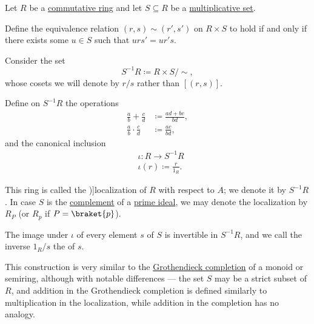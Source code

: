 \begin{definition}\label{def:ring_localization}
  Let \( R \) be a \hyperref[def:ring/commutative]{commutative ring} and let \( S \subseteq R \) be a \hyperref[def:multiplicative_set_in_ring]{multiplicative set}.

  Define the equivalence relation \( (r, s) \sim (r', s') \) on \( R \times S \) to hold if and only if there exists some \( u \in S \) such that \( u r s' = u r' s \).

  Consider the set
  \begin{equation*}
    S^{-1} R \coloneqq R \times S / {\sim},
  \end{equation*}
  whose cosets we will denote by \( r / s \) rather than \( [(r, s)] \).

  Define on \( S^{-1} R \) the operations
  \begin{align*}
    \frac a b + \frac c d     &\coloneqq \frac {a d + b c} {b d}, \\
    \frac a b \cdot \frac c d &\coloneqq \frac {a c} {b d},
  \end{align*}
  and the canonical inclusion
  \begin{equation*}
    \begin{aligned}
      &\iota: R \to S^{-1} R \\
      &\iota(r) \coloneqq \frac r {1_R}.
    \end{aligned}
  \end{equation*}

  This ring is called the \term[bg=локализация (\cite[23]{КоцевСидеров2016})]{localization} of \( R \) with respect to \( A \); we denote it by \( S^{-1} R \). In case \( S \) is the \hyperref[thm:boolean_algebra_of_subsets/complement]{complement} of a \hyperref[def:semiring_ideal/prime]{prime ideal}, we may denote the localization by \( R_P \) (or \( R_p \) if \( P = \braket{ p } \)).

  The image under \( \iota \) of every element \( s \) of \( S \) is invertible in \( S^{-1} R \), and we call the inverse \( 1_R / s \) the  of \( s \).
\end{definition}
\begin{comments}
  \item This construction is very similar to the \hyperref[def:monoid_grothendieck_completion]{Grothendieck completion} of a monoid or semiring, although with notable differences --- the set \( S \) may be a strict subset of \( R \), and addition in the Grothendieck completion is defined similarly to multiplication in the localization, while addition in the completion has no analogy.
\end{comments}
